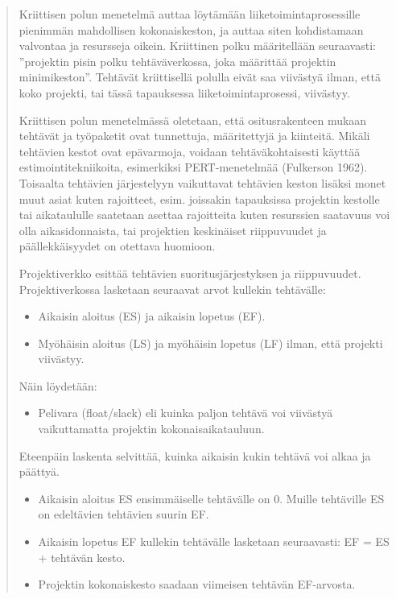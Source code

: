 \documentclass[
  finnish,
  letterpaper,
  DIV=11,
  numbers=noendperiod,
  oneside]{scrreprt}
\providecommand{\tightlist}{%
  \setlength{\itemsep}{0pt}\setlength{\parskip}{0pt}}
\begin{document}
\begin{quote}
Kriittisen polun menetelmä auttaa löytämään liiketoimintaprosessille
pienimmän mahdollisen kokonaiskeston, ja auttaa siten kohdistamaan
valvontaa ja resursseja oikein. Kriittinen polku määritellään
seuraavasti: ''projektin pisin polku tehtäväverkossa, joka määrittää
projektin minimikeston''. Tehtävät kriittisellä polulla eivät saa
viivästyä ilman, että koko projekti, tai tässä tapauksessa
liiketoimintaprosessi, viivästyy.

Kriittisen polun menetelmässä oletetaan, että ositusrakenteen mukaan
tehtävät ja työpaketit ovat tunnettuja, määritettyjä ja kiinteitä.
Mikäli tehtävien kestot ovat epävarmoja, voidaan tehtäväkohtaisesti
käyttää estimointitekniikoita, esimerkiksi PERT-menetelmää (Fulkerson
1962). Toisaalta tehtävien järjestelyyn vaikuttavat tehtävien keston
lisäksi monet muut asiat kuten rajoitteet, esim. joissakin tapauksissa
projektin kestolle tai aikataululle saatetaan asettaa rajoitteita kuten
resurssien saatavuus voi olla aikasidonnaista, tai projektien
keskinäiset riippuvuudet ja päällekkäisyydet on otettava huomioon.

Projektiverkko esittää tehtävien suoritusjärjestyksen ja riippuvuudet.
Projektiverkossa lasketaan seuraavat arvot kullekin tehtävälle:

\begin{itemize}
\tightlist
\item
  Aikaisin aloitus (ES) ja aikaisin lopetus (EF).
\item
  Myöhäisin aloitus (LS) ja myöhäisin lopetus (LF) ilman, että projekti
  viivästyy.
\end{itemize}

Näin löydetään:

\begin{itemize}
\tightlist
\item
  Pelivara (float/slack) eli kuinka paljon tehtävä voi viivästyä
  vaikuttamatta projektin kokonaisaikatauluun.
\end{itemize}

Eteenpäin laskenta selvittää, kuinka aikaisin kukin tehtävä voi alkaa ja
päättyä.

\begin{itemize}
\tightlist
\item
  Aikaisin aloitus ES ensimmäiselle tehtävälle on 0. Muille tehtäville
  ES on edeltävien tehtävien suurin EF.
\item
  Aikaisin lopetus EF kullekin tehtävälle lasketaan seuraavasti: EF = ES
  + tehtävän kesto.
\item
  Projektin kokonaiskesto saadaan viimeisen tehtävän EF-arvosta.
\end{itemize}


\end{quote}
\end{document}
